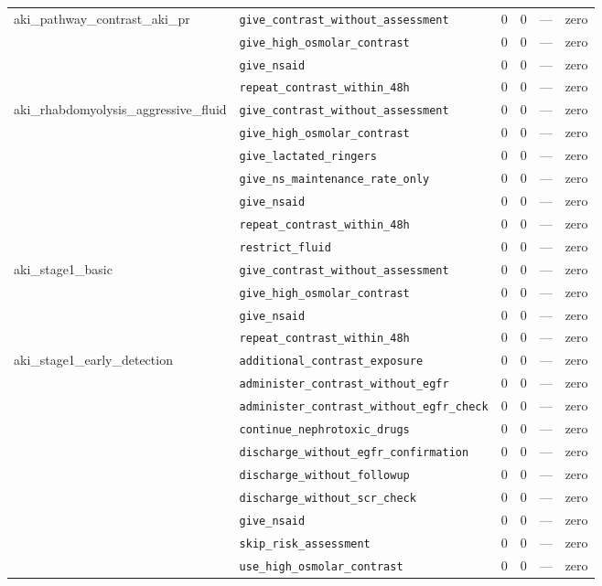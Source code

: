 \begin{table}[ht]
\begin{tabular}{llrrrl}
\midrule
aki\_pathway\_contrast\_aki\_pr & \texttt{give\_contrast\_without\_assessment} & 0 & 0 & — & zero \\
 & \texttt{give\_high\_osmolar\_contrast} & 0 & 0 & — & zero \\
 & \texttt{give\_nsaid} & 0 & 0 & — & zero \\
 & \texttt{repeat\_contrast\_within\_48h} & 0 & 0 & — & zero \\
\midrule
aki\_rhabdomyolysis\_aggressive\_fluid & \texttt{give\_contrast\_without\_assessment} & 0 & 0 & — & zero \\
 & \texttt{give\_high\_osmolar\_contrast} & 0 & 0 & — & zero \\
 & \texttt{give\_lactated\_ringers} & 0 & 0 & — & zero \\
 & \texttt{give\_ns\_maintenance\_rate\_only} & 0 & 0 & — & zero \\
 & \texttt{give\_nsaid} & 0 & 0 & — & zero \\
 & \texttt{repeat\_contrast\_within\_48h} & 0 & 0 & — & zero \\
 & \texttt{restrict\_fluid} & 0 & 0 & — & zero \\
\midrule
aki\_stage1\_basic & \texttt{give\_contrast\_without\_assessment} & 0 & 0 & — & zero \\
 & \texttt{give\_high\_osmolar\_contrast} & 0 & 0 & — & zero \\
 & \texttt{give\_nsaid} & 0 & 0 & — & zero \\
 & \texttt{repeat\_contrast\_within\_48h} & 0 & 0 & — & zero \\
\midrule
aki\_stage1\_early\_detection & \texttt{additional\_contrast\_exposure} & 0 & 0 & — & zero \\
 & \texttt{administer\_contrast\_without\_egfr} & 0 & 0 & — & zero \\
 & \texttt{administer\_contrast\_without\_egfr\_check} & 0 & 0 & — & zero \\
 & \texttt{continue\_nephrotoxic\_drugs} & 0 & 0 & — & zero \\
 & \texttt{discharge\_without\_egfr\_confirmation} & 0 & 0 & — & zero \\
 & \texttt{discharge\_without\_followup} & 0 & 0 & — & zero \\
 & \texttt{discharge\_without\_scr\_check} & 0 & 0 & — & zero \\
 & \texttt{give\_nsaid} & 0 & 0 & — & zero \\
 & \texttt{skip\_risk\_assessment} & 0 & 0 & — & zero \\
 & \texttt{use\_high\_osmolar\_contrast} & 0 & 0 & — & zero \\

\end{tabular}
\end{table}
